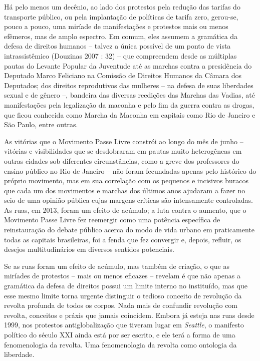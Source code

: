Há pelo menos um decênio, ao lado dos protestos pela redução das tarifas
do transporte público, ou pela implantação de políticas de tarifa zero,
gerou-se, pouco a pouco, uma miríade de manifestações e protestos mais
ou menos efêmeros, mas de amplo espectro. Em comum, eles assumem a
gramática da defesa de direitos humanos -- talvez a única possível de um
ponto de vista intrassistêmico (Douzinas 2007 : 32) -- que compreendem
desde as múltiplas pautas do Levante Popular da Juventude até as marchas
contra a presidência do Deputado Marco Feliciano na Comissão de Direitos
Humanos da Câmara dos Deputados; dos direitos reprodutivos das mulheres
-- na defesa de suas liberdades sexual e de gênero --, bandeira das
diversas reedições das Marchas das Vadias, até manifestações pela
legalização da maconha e pelo fim da guerra contra as drogas, que ficou
conhecida como Marcha da Maconha em capitais como Rio de Janeiro e São
Paulo, entre outras.

As vitórias que o Movimento Passe Livre constrói ao longo do mês de
junho -- vitórias e visibilidades que se desdobraram em pautas muito
heterogêneas em outras cidades sob diferentes circunstâncias, como a
greve dos professores do ensino público no Rio de Janeiro -- não foram
fecundadas apenas pelo histórico do próprio movimento, mas em sua
correlação com os pequenos e incisivos buracos que cada um dos
movimentos e marchas dos últimos anos ajudaram a fazer no seio de uma
opinião pública cujas margens críticas são intensamente controladas. As
ruas, em 2013, foram um efeito de acúmulo; a luta contra o aumento, que
o Movimento Passe Livre fez reemergir como uma potência específica de
reinstauração do debate público acerca do modo de vida urbano em
praticamente todas as capitais brasileiras, foi a fenda que fez
convergir e, depois, refluir, os desejos multitudinários em diversos
sentidos potenciais.

Se as ruas foram um efeito de acúmulo, mas também de criação, o que as
miríades de protestos -- mais ou menos eficazes -- revelam é que não
apenas a gramática da defesa de direitos possui um limite interno no
instituído, mas que esse mesmo limite torna urgente distinguir o tedioso
conceito de revolução da revolta profunda de todos os corpos. Nada mais
de confundir revolução com revolta, conceitos e práxis que jamais
coincidem. Embora já esteja nas ruas desde 1999, nos protestos
antiglobalização que tiveram lugar em \emph{Seattle}, o manifesto
político do século XXI ainda está por ser escrito, e ele terá a forma de
uma fenomenologia da revolta. Uma fenomenologia da revolta como
ontologia da liberdade.

